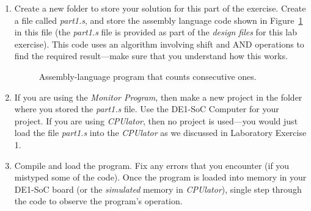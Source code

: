 \documentclass[epsfig,10pt,fullpage]{article}
\begin{document}
\begin{enumerate}
\item Create a new folder to store your solution for this part of the exercise. Create a
file called {\it part1.s}, and store the assembly language code shown in Figure~\ref{fig:code}
in this file (the {\it part1.s} file is provided as part of the {\it design files} for this 
lab exercise). This code uses an algorithm involving shift and 
AND operations to find the required result---make sure that you understand how this works.

\begin{figure}[H]
\begin{center}

\end{center}
\caption{Assembly-language program that counts consecutive ones.}
\label{fig:code}
\end{figure}

\newpage
\item
If you are using the {\it Monitor Program}, then make a new project in the folder where you 
stored the {\it part1.s} file. Use the DE1-SoC Computer for your project. If you are using 
{\it CPUlator}, then no project is used---you would just load the file {\it part1.s} into 
the {\it CPUlator} as we discussed in Laboratory Exercise 1.
\item
Compile and load the program. Fix any errors that you encounter (if you mistyped some of
the code). Once the program is loaded into memory in your DE1-SoC board (or the {\it simulated}
memory in {\it CPUlator}), single step through the code to observe the program's operation.
\end{enumerate}
\end{document}
